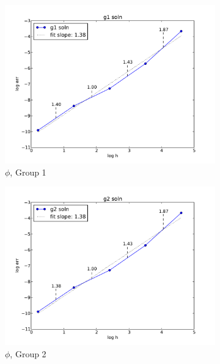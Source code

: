 \documentclass[11pt]{article}
\begin{document}
\begin{figure}[H]
\centering
  \begin{subfigure}[b]{0.3 \textwidth}
   \includegraphics[width=\textwidth]{g1}
   \caption{$\phi$, Group 1}
   \label{g1conv}
  \end{subfigure}
  \begin{subfigure}[b]{0.3 \textwidth}
   \includegraphics[width=\textwidth]{g2}
   \caption{$\phi$, Group 2}
   \label{g2conv}
  \end{subfigure}
  \begin{subfigure}[b]{0.3 \textwidth}

\end{subfigure}
\end{figure}
\end{document}
